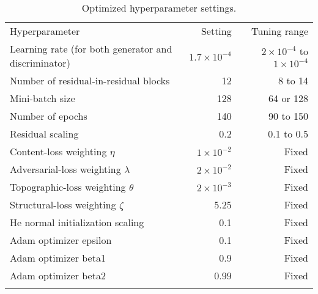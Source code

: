 \documentclass[tc, noline]{copernicus}
\begin{document}
\begin{table}[h!]
\hack{\hsize\textwidth}
\caption{Optimized hyperparameter settings.}
\label{table:B1}
\begin{tabular}{lrr}
\tophline
Hyperparameter                                       & Setting             & Tuning range                           \\\middlehline
Learning rate (for both generator and discriminator) & $1.7\times 10^{-4}$ & $2\times 10^{-4}$ to $1\times 10^{-4}$ \\
Number of residual-in-residual blocks                & 12                  & 8 to 14                                \\
Mini-batch size                                      & 128                 & 64 or 128                              \\
Number of epochs                                     & 140                 & 90 to 150                              \\
Residual scaling                                     & 0.2                 & 0.1 to 0.5                             \\
Content-loss weighting $\eta$                        & $1\times 10^{-2}$   & Fixed                                  \\
Adversarial-loss weighting $\lambda$                 & $2\times 10^{-2}$   & Fixed                                  \\
Topographic-loss weighting $\theta$                  & $2\times 10^{-3}$   & Fixed                                  \\
Structural-loss weighting $\zeta$                    & 5.25                & Fixed                                  \\
He normal initialization scaling                     & 0.1                 & Fixed                                  \\
Adam optimizer epsilon                               & 0.1                 & Fixed                                  \\
Adam optimizer beta1                                 & 0.9                 & Fixed                                  \\
Adam optimizer beta2                                 & 0.99                & Fixed                                  \\
\bottomhline
\end{tabular}
\end{table}
\end{document}
